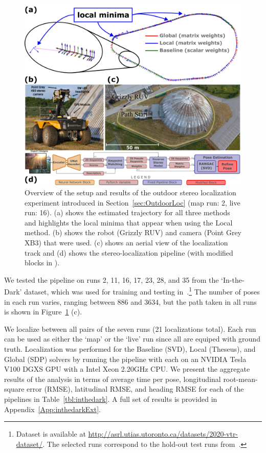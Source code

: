 \documentclass[lettersize,journal]{IEEEtran}
\begin{document}
\begin{figure}[]
	\centering
	\includegraphics[width=\columnwidth]{figs/in-the-dark-traj.png}
	\caption{Overview of the setup and results of the outdoor stereo localization experiment introduced in Section~\ref{sec:OutdoorLoc} (map run: 2, live run: 16). (a) shows the estimated trajectory for all three methods and highlights the local minima that appear when using the Local method. (b) shows the robot (Grizzly RUV) and camera (Point Grey XB3) that were used. (c) shows an aerial view of the localization track and (d) shows the stereo-localization pipeline (with modified blocks in \color{red}{red}).}
	\label{fig:inthedark}
\end{figure}

We tested the pipeline on runs 2, 11, 16, 17, 23, 28, and 35 from the `In-the-Dark' dataset, which was used for training and testing in~\cite{gridsethKeepingEyeThings2022}.\footnote{Dataset is available at \url{http://asrl.utias.utoronto.ca/datasets/2020-vtr-dataset/}. The selected runs correspond to the hold-out test runs from~\cite{gridsethKeepingEyeThings2022}.} The number of poses in each run varies, ranging between 886 and 3634, but the path taken in all runs is shown in Figure~\ref{fig:inthedark} (c). 

We localize between all pairs of the seven runs (21 localizations total). Each run can be used as either the `map' or the `live' run since all are equiped with ground truth. Localization was performed for the Baseline (SVD), Local (Theseus), and Global (SDP) solvers by running the pipeline with each on an NVIDIA Tesla V100 DGXS GPU with a Intel Xeon 2.20GHz CPU. We present the aggregate results of the analysis in terms of average time per pose, longitudinal root-mean-square error (RMSE), latitudinal RMSE, and heading RMSE for each of the pipelines in Table~\ref{tbl:inthedark}. A full set of results is provided in Appendix~\ref{App:inthedarkExt}.
\end{document}
